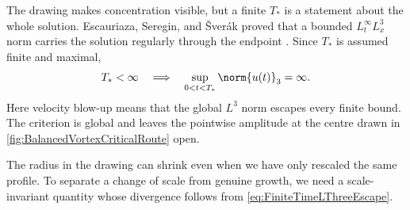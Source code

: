 The drawing makes concentration visible, but a finite \(T_*\) is a statement about the whole solution.
Escauriaza, Seregin, and \v{S}ver\'ak proved that a bounded \(L^\infty_tL^3_x\) norm carries the solution regularly through the endpoint \parencite{EscauriazaSereginSverak2003}.
Since \(T_*\) is assumed finite and maximal,
\begin{equation}\label{eq:FiniteTimeLThreeEscape}
  T_*<\infty
  \quad\Longrightarrow\quad
  \sup_{0<t<T_*}\norm{u(t)}_3=\infty.
\end{equation}
Here velocity blow-up means that the global \(L^3\) norm escapes every finite bound.
The criterion is global and leaves the pointwise amplitude at the centre drawn in \cref{fig:BalancedVortexCriticalRoute} open.

The radius in the drawing can shrink even when we have only rescaled the same profile.
To separate a change of scale from genuine growth, we need a scale-invariant quantity whose divergence follows from \eqref{eq:FiniteTimeLThreeEscape}.
